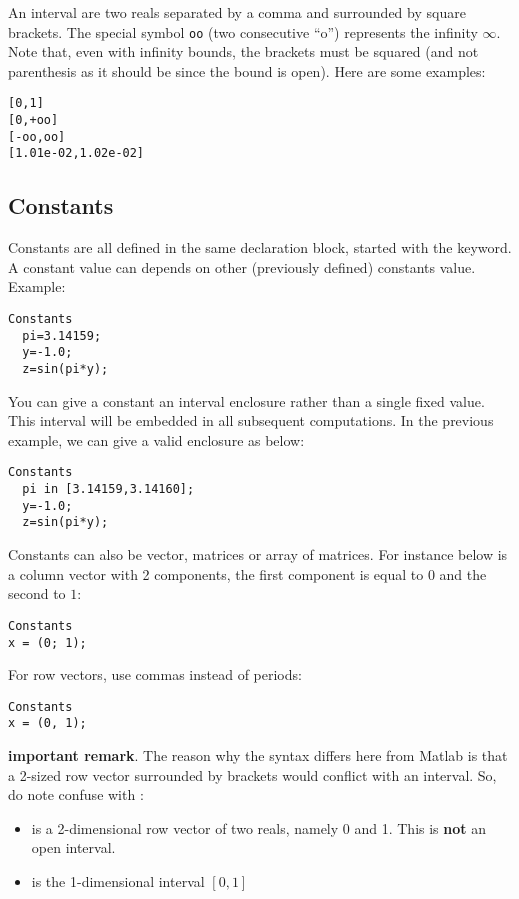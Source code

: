 An interval are two reals separated by a comma
and surrounded by square brackets. The special symbol
{\tt oo} (two consecutive ``o'') represents the infinity $\infty$.
Note that, even with infinity bounds, the brackets
must be squared (and not parenthesis as it should be since the
bound is open). Here are some examples:

\begin{verbatim}
[0,1]
[0,+oo]
[-oo,oo]
[1.01e-02,1.02e-02]
\end{verbatim}

\subsection{Constants}
Constants are all defined in the same declaration block, 
started with the  keyword.
A constant value can depends on other (previously defined) constants value. Example:

\begin{verbatim}
Constants
  pi=3.14159;
  y=-1.0;
  z=sin(pi*y);
\end{verbatim} 

You can give a constant an interval enclosure rather than a single fixed value.
This interval will be embedded in all subsequent computations.
In the previous example, we can give  a valid enclosure as below:

\begin{verbatim}
Constants
  pi in [3.14159,3.14160];
  y=-1.0;
  z=sin(pi*y);
\end{verbatim}

Constants can also be vector, matrices or array of matrices.
For instance  below is a column vector with 2 components, the first component is equal
to $0$ and the second to $1$:
\begin{verbatim}
Constants
x = (0; 1);
\end{verbatim}
For row vectors, use commas instead of periods:
\begin{verbatim}
Constants
x = (0, 1);
\end{verbatim}

{\bf important remark}. 
The reason why the syntax differs here from Matlab is that a 2-sized row vector surrounded
by brackets would conflict with an interval. So, do note confuse
\cf{[0,1]} with :
\begin{itemize}
\item {} is a 2-dimensional row vector of two reals, namely 0 and 1.
This is {\bf not} an open interval.
\item \cf{[0,1]} is the 1-dimensional interval $[0,1]$
\end{itemize}

